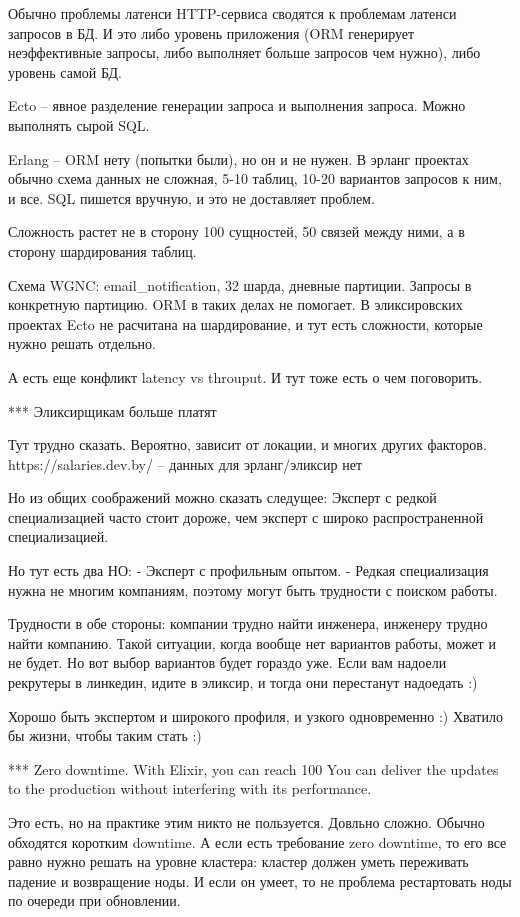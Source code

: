 \documentclass[10pt]{beamer}
\begin{document}
Обычно проблемы латенси HTTP-сервиса сводятся к проблемам латенси запросов в БД.
И это либо уровень приложения (ORM генерирует неэффективные запросы, либо выполняет больше запросов чем нужно),
либо уровень самой БД.

Ecto -- явное разделение генерации запроса и выполнения запроса. Можно выполнять сырой SQL.

Erlang -- ORM нету (попытки были), но он и не нужен.
В эрланг проектах обычно схема данных не сложная, 5-10 таблиц, 10-20 вариантов запросов к ним, и все.
SQL пишется вручную, и это не доставляет проблем.

Сложность растет не в сторону 100 сущностей, 50 связей между ними, а в сторону шардирования таблиц.

Схема WGNC: email_notification, 32 шарда, дневные партиции. Запросы в конкретную партицию. ORM в таких делах не помогает.
В эликсировских проектах Ecto не расчитана на шардирование, и тут есть сложности, которые нужно решать отдельно.

А есть еще конфликт latency vs throuput. И тут тоже есть о чем поговорить.



*** Эликсирщикам больше платят

Тут трудно сказать. Вероятно, зависит от локации, и многих других факторов.
https://salaries.dev.by/ -- данных для эрланг/эликсир нет

Но из общих соображений можно сказать следущее:
Эксперт с редкой специализацией часто стоит дороже, чем эксперт с широко распространенной специализацией.

Но тут есть два НО:
- Эксперт с профильным опытом.
- Редкая специализация нужна не многим компаниям, поэтому могут быть трудности с поиском работы.

Трудности в обе стороны: компании трудно найти инженера, инженеру трудно найти компанию.
Такой ситуации, когда вообще нет вариантов работы, может и не будет. Но вот выбор вариантов будет гораздо уже.
Если вам надоели рекрутеры в линкедин, идите в эликсир, и тогда они перестанут надоедать :)

Хорошо быть экспертом и широкого профиля, и узкого одновременно :) Хватило бы жизни, чтобы таким стать :)


*** Zero downtime. With Elixir, you can reach 100%
You can deliver the updates to the production without interfering with its performance.

Это есть, но на практике этим никто не пользуется. Довльно сложно. Обычно обходятся коротким downtime.
А если есть требование zero downtime, то его все равно нужно решать на уровне кластера: кластер должен уметь переживать падение и возвращение ноды.
И если он умеет, то не проблема рестартовать ноды по очереди при обновлении.
\end{document}
